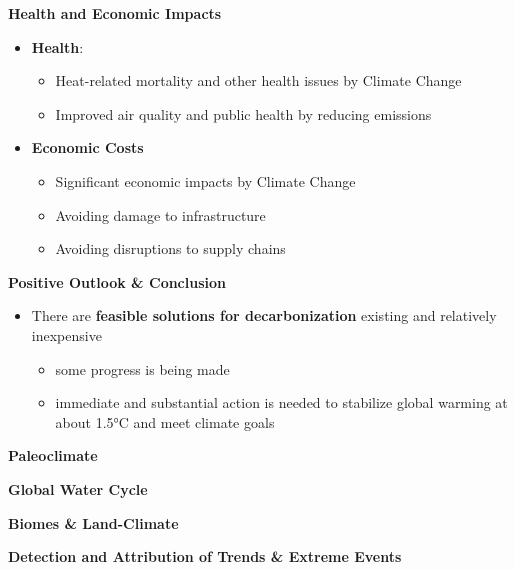 \documentclass[fontsize=8pt, a4paper, landscape, fleqn]{scrartcl}
\renewcommand{\section}[1]{%
    \noindent\colorbox{sectioncolor}{%
        \parbox{\dimexpr\columnwidth-2\fboxsep}{\color{white}\textbf{#1}}}%
    \vspace{0.5mm}%
}
\renewcommand{\subsection}[1]{%
    \noindent\colorbox{subsectioncolor}{%
        \parbox{\dimexpr\columnwidth-2\fboxsep}{\color{white}\textbf{#1}}}%
    \vspace{0.5mm}%
}
\begin{document}
\begin{multicols*}{3}[\raggedcolumns]
\subsection{Health and Economic Impacts}
\begin{itemize}
    \item \textbf{Health}:
        \begin{itemize}
            \item Heat-related mortality and other health issues by Climate Change
            \item Improved air quality and public health by reducing emissions
        \end{itemize}
    \item \textbf{Economic Costs}
        \begin{itemize}
            \item Significant economic impacts by Climate Change
            \item Avoiding damage to infrastructure
            \item Avoiding disruptions to supply chains
        \end{itemize}
\end{itemize}

\subsection{Positive Outlook \& Conclusion}
\begin{itemize}
    \item There are \textbf{feasible solutions for decarbonization} existing and relatively inexpensive
        \begin{itemize}
            \item some progress is being made
            \item immediate and substantial action is needed to stabilize global warming at about 1.5°C and meet climate goals
        \end{itemize}
\end{itemize}

\section{Paleoclimate}
\section{Global Water Cycle}
\section{Biomes \& Land-Climate}
\section{Detection and Attribution of Trends \& Extreme Events}
\end{multicols*}
\end{document}
